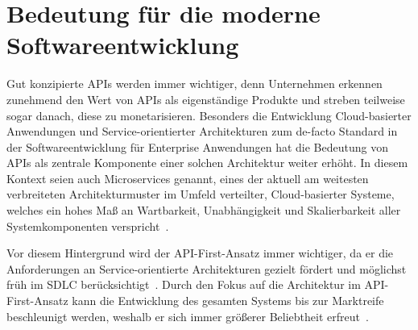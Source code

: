 \section{Bedeutung für die moderne Softwareentwicklung}
Gut konzipierte \acp{API} werden immer wichtiger, denn Unternehmen erkennen zunehmend den Wert von \acp{API} als eigenständige Produkte und streben teilweise sogar danach, diese zu monetarisieren.
Besonders die Entwicklung Cloud-basierter Anwendungen und Service-orientierter Architekturen zum de-facto Standard in der Softwareentwicklung für Enterprise Anwendungen hat die Bedeutung von \acp{API} als zentrale Komponente einer solchen Architektur weiter erhöht.
In diesem Kontext seien auch Microservices genannt, eines der aktuell am weitesten verbreiteten Architekturmuster im Umfeld verteilter, Cloud-basierter Systeme, welches ein hohes Maß an Wartbarkeit, Unabhängigkeit und Skalierbarkeit aller Systemkomponenten verspricht~\autocites[73-75]{bea22}[5]{kul23}.

Vor diesem Hintergrund wird der API-First-Ansatz immer wichtiger, da er die Anforderungen an Service-orientierte Architekturen gezielt fördert und möglichst früh im \ac{SDLC} berücksichtigt~\autocite[1627]{cha21}.
Durch den Fokus auf die Architektur im API-First-Ansatz kann die Entwicklung des gesamten Systems bis zur Marktreife beschleunigt werden, weshalb er sich immer größerer Beliebtheit erfreut~\autocite[76]{bea22}.